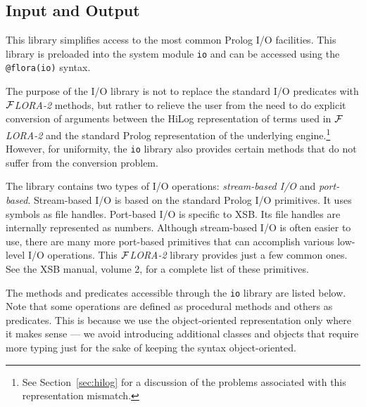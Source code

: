 \documentclass[11pt]{article}
\newcommand{\FLORA}{{\mbox{${\cal F}${\small\it LORA}\rm\emph{-2}}}\xspace}
\begin{document}
\subsection{Input and Output}

This library simplifies access to the most common Prolog I/O facilities.
This library is preloaded into the system module {\tt io} and
can be accessed using the {\tt @flora(io)} syntax.

The purpose of the I/O library is not to replace the standard I/O predicates
with \FLORA methods, but rather to relieve the user from the need to do
explicit conversion of arguments between the HiLog representation of terms
used in \FLORA and the standard Prolog representation of the underlying
engine.\footnote{
  See Section~\ref{sec:hilog} for a discussion of the problems associated
  with this representation mismatch.
  }
However, for uniformity, the {\tt io} library also provides certain methods
that do not suffer from the conversion problem.

The library contains two types of I/O operations: \emph{stream-based I/O}
and \emph{port-based}.  Stream-based I/O is based on the standard Prolog
I/O primitives. It uses symbols as file handles. Port-based I/O is specific
to XSB. Its file handles are internally represented as numbers. Although
stream-based I/O is often easier to use, there are many more port-based
primitives that can accomplish various low-level I/O operations. This
\FLORA library provides just a few common ones. See the XSB manual, volume
2, for a complete list of these primitives.

The methods and predicates accessible through the {\tt io} library are
listed below.  Note that some operations are defined as procedural methods
and others as predicates. This is because we use the object-oriented
representation only where it makes sense --- we avoid introducing
additional classes and objects that require more typing just for the sake
of keeping the syntax object-oriented.
\end{document}
